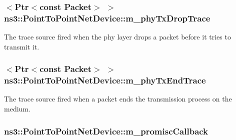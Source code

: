 \subsubsection[{\texorpdfstring{m\+\_\+phy\+Tx\+Drop\+Trace}{m_phyTxDropTrace}}]{$<${\bf Ptr}$<$const {\bf Packet}$>$ $>$ ns3\+::\+Point\+To\+Point\+Net\+Device\+::m\+\_\+phy\+Tx\+Drop\+Trace\hspace{0.3cm}{\ttfamily [private]}}\hypertarget{classns3_1_1PointToPointNetDevice_a66a13667106d35d2cbf70c166617c660}{}\label{classns3_1_1PointToPointNetDevice_a66a13667106d35d2cbf70c166617c660}
The trace source fired when the phy layer drops a packet before it tries to transmit it. 
\subsubsection[{\texorpdfstring{m\+\_\+phy\+Tx\+End\+Trace}{m_phyTxEndTrace}}]{$<${\bf Ptr}$<$const {\bf Packet}$>$ $>$ ns3\+::\+Point\+To\+Point\+Net\+Device\+::m\+\_\+phy\+Tx\+End\+Trace\hspace{0.3cm}{\ttfamily [private]}}\hypertarget{classns3_1_1PointToPointNetDevice_ad24afff2bade80cd2e2b952117f3945a}{}\label{classns3_1_1PointToPointNetDevice_ad24afff2bade80cd2e2b952117f3945a}
The trace source fired when a packet ends the transmission process on the medium. 
\subsubsection[{\texorpdfstring{m\+\_\+promisc\+Callback}{m_promiscCallback}}]{ ns3\+::\+Point\+To\+Point\+Net\+Device\+::m\+\_\+promisc\+Callback\hspace{0.3cm}{\ttfamily [private]}}\hypertarget{classns3_1_1PointToPointNetDevice_aea1f86277e393aa99e45f7c1f18c6799}{}\label{classns3_1_1PointToPointNetDevice_aea1f86277e393aa99e45f7c1f18c6799}


